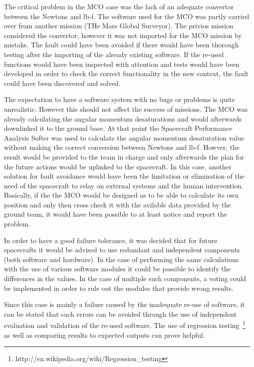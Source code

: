 The critical problem in the MCO case was the lack of an adequate convertor
between the Newtons and lb-f. The software used for the MCO was partly carried
over from another mission (THe Mars Global Surveyor). The privios mission
considered the convertor, however it was not imported for the MCO mission by
mistake. The fault could have been avoided if there would have been thorough
testing after the importing of the already existing software. If the re-used
functions would have been inspected with attention and tests would have been
developed in order to check the correct functionality in the new context, the
fault could have been discovered and solved.

The expectation to have a software system with no bugs or problems is quite
unrealistic. However this should not affect the success of missions. The MCO was
already calculating the angular momentum desaturations and would afterwards
downlinked it to the ground base. At that point the Spacecraft Performance
Analysis Softer was used to calculate the angular momentum desaturation value
without making the correct conversion between Newtons and lb-f. Howver, the
result would be provided to the team in charge and only afterwards the plan for
the future actions would be uplinked to the spacecraft. In this case, another
solution for fault avoidance would have been the limitation or elimination of
the need of the spacecraft to relay on external systems and the human
intervention. Basically, if the the MCO would be designed as to be able to
calculate its own position and only then cross check it with the avilable data
provided by the ground team, it would have been possible to at least notice and
report the problem.

In order to have a good failure tolerance, it was decided that for future
spacecrafts it would be advised to use redundant and independent components
(both software and hardware). In the case of performing the same calculations
with the use of various software modules it could be possible to identify the
differences in the values. In the case of multiple such components, a voting
could be implemented in order to rule out the modules that provide wrong
results.

Since this case is mainly a failure caused by the inadequate re-use of
software, it can be stated that such errors can be avoided through the use of
independent evaluation and validation of the re-used software. The use of
regression testing~\footnote{http://en.wikipedia.org/wiki/Regression\_testing}
as well as comparing results to expected outputs can prove helpful.
